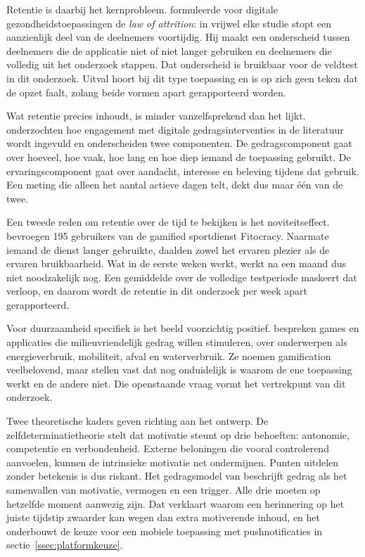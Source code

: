 \documentclass{hogent-article}
\begin{document}
    Retentie is daarbij het kernprobleem. \textcite{Eysenbach2005} formuleerde voor
    digitale gezondheidstoepassingen de \emph{law of attrition}: in vrijwel elke
    studie stopt een aanzienlijk deel van de deelnemers voortijdig. Hij maakt een
    onderscheid tussen deelnemers die de applicatie niet of niet langer gebruiken en
    deelnemers die volledig uit het onderzoek stappen. Dat onderscheid is bruikbaar
    voor de veldtest in dit onderzoek. Uitval hoort bij dit type toepassing en is op
    zich geen teken dat de opzet faalt, zolang beide vormen apart gerapporteerd
    worden.
    
    Wat retentie precies inhoudt, is minder vanzelfsprekend dan het lijkt.
    \textcite{Perski2017} onderzochten hoe engagement met digitale
    gedragsinterventies in de literatuur wordt ingevuld en onderscheiden twee
    componenten. De gedragscomponent gaat over hoeveel, hoe vaak, hoe lang en hoe
    diep iemand de toepassing gebruikt. De ervaringscomponent gaat over aandacht,
    interesse en beleving tijdens dat gebruik. Een meting die alleen het aantal
    actieve dagen telt, dekt dus maar één van de twee.
    
    Een tweede reden om retentie over de tijd te bekijken is het noviteitseffect.
    \textcite{KoivistoHamari2014} bevroegen 195 gebruikers van de gamified
    sportdienst Fitocracy. Naarmate iemand de dienst langer gebruikte, daalden zowel
    het ervaren plezier als de ervaren bruikbaarheid. Wat in de eerste weken werkt,
    werkt na een maand dus niet noodzakelijk nog. Een gemiddelde over de volledige
    testperiode maskeert dat verloop, en daarom wordt de retentie in dit onderzoek
    per week apart gerapporteerd.
    
    Voor duurzaamheid specifiek is het beeld voorzichtig positief.
    \textcite{DouglasBrauer2021} bespreken games en applicaties die
    milieuvriendelijk gedrag willen stimuleren, over onderwerpen als
    energieverbruik, mobiliteit, afval en waterverbruik. Ze noemen gamification
    veelbelovend, maar stellen vast dat nog onduidelijk is waarom de ene toepassing
    werkt en de andere niet. Die openstaande vraag vormt het vertrekpunt van dit
    onderzoek.
    
    Twee theoretische kaders geven richting aan het ontwerp. De
    zelfdeterminatietheorie \autocite{RyanDeci2000} stelt dat motivatie steunt op
    drie behoeften: autonomie, competentie en verbondenheid. Externe beloningen die
    vooral controlerend aanvoelen, kunnen de intrinsieke motivatie net ondermijnen.
    Punten uitdelen zonder betekenis is dus riskant. Het gedragsmodel van
    \textcite{Fogg2009} beschrijft gedrag als het samenvallen van motivatie,
    vermogen en een trigger. Alle drie moeten op hetzelfde moment aanwezig zijn. Dat
    verklaart waarom een herinnering op het juiste tijdstip zwaarder kan wegen dan
    extra motiverende inhoud, en het onderbouwt de keuze voor een mobiele toepassing
    met pushnotificaties in sectie~\ref{ssec:platformkeuze}.
    
\end{document}
